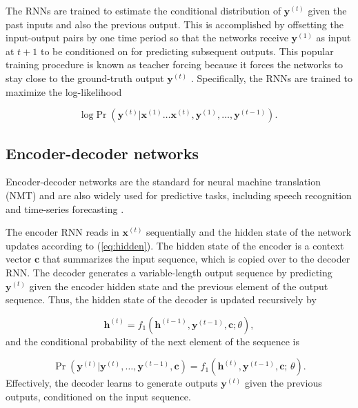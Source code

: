 The RNNs are trained to estimate the conditional distribution of $\boldsymbol{y}^{(t)}$ given the past inputs and also the previous output. This is accomplished by offsetting the input-output pairs by one time period so that the networks receive $\boldsymbol{y}^{(1)}$  as input at $t + 1$ to be conditioned on for predicting subsequent outputs. This popular training procedure is known as teacher forcing because it forces the networks to stay close to the ground-truth output $\boldsymbol{y}^{(t)}$ \citep{lamb2016professor}. Specifically, the RNNs are trained to maximize the log-likelihood

\begin{equation} \label{rnn-obj}
	\text{log} \Pr \left(\boldsymbol{y}^{(t)} | \boldsymbol{x}^{(1)} \ldots \boldsymbol{x}^{(t)},\boldsymbol{y}^{(1)}, \ldots, \boldsymbol{y}^{(t-1)} \right).
\end{equation}

\subsection{Encoder-decoder networks}

Encoder-decoder networks are the standard for neural machine translation (NMT) \citep{cho2014learning,bahdanau2014neural,vinyals2014grammar} and are also widely used for predictive tasks, including speech recognition \citep{chorowski2015attention} and time-series forecasting \citep{zhu2017deep}. 

The encoder RNN reads in $\boldsymbol{x}^{(t)}$ sequentially and the hidden state of the network updates according to (\ref{eq:hidden}). The hidden state of the encoder is a context vector $\boldsymbol{c}$ that summarizes the input sequence, which is copied over to the decoder RNN. The decoder generates a variable-length output sequence by predicting $\boldsymbol{y}^{(t)}$ given the encoder hidden state and the previous element of the output sequence. Thus, the hidden state of the decoder is updated recursively by

\begin{equation}
	\boldsymbol{h}^{(t)} = f_1 \left( \boldsymbol{h}^{(t-1)}, \boldsymbol{y}^{(t-1)}, \boldsymbol{c}; \theta \right), \label{eq:decoder}
\end{equation} and the conditional probability of the next element of the sequence is 

\begin{equation}
	\Pr (\boldsymbol{y}^{(t)} | \boldsymbol{y}^{(t)}, \ldots, \boldsymbol{y}^{(t-1)}, \boldsymbol{c}) =  f_1 \left( \boldsymbol{h}^{(t)}, \boldsymbol{y}^{(t-1)}, \boldsymbol{c}; \, \theta \right).
\end{equation}  Effectively, the decoder learns to generate outputs $\boldsymbol{y}^{(t)}$ given the previous outputs, conditioned on the input sequence. 

